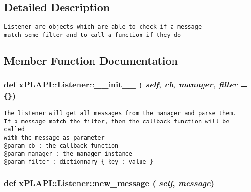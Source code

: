 \subsection{Detailed Description}


\footnotesize\begin{verbatim}
Listener are objects which are able to check if a message
match some filter and to call a function if they do
\end{verbatim}
\normalsize
 

\subsection{Member Function Documentation}
\hypertarget{classxPLAPI_1_1Listener_31c68a5ad76d56eff1b78dd646a18e58}{
\subsubsection[\_\-\_\-init\_\-\_\-]{\setlength{\rightskip}{0pt plus 5cm}def xPLAPI::Listener::\_\-\_\-init\_\-\_\- ( {\em self}, \/   {\em cb}, \/   {\em manager}, \/   {\em filter} = {\tt \{\}})}}
\label{classxPLAPI_1_1Listener_31c68a5ad76d56eff1b78dd646a18e58}




\footnotesize\begin{verbatim}
The listener will get all messages from the manager and parse them.
If a message match the filter, then the callback function will be called
with the message as parameter
@param cb : the callback function
@param manager : the manager instance
@param filter : dictionnary { key : value } 
\end{verbatim}
\normalsize
 \hypertarget{classxPLAPI_1_1Listener_a6e3c6a481054d9ff921507b784b0f12}{
\subsubsection[new\_\-message]{\setlength{\rightskip}{0pt plus 5cm}def xPLAPI::Listener::new\_\-message ( {\em self}, \/   {\em message})}}
\label{classxPLAPI_1_1Listener_a6e3c6a481054d9ff921507b784b0f12}





